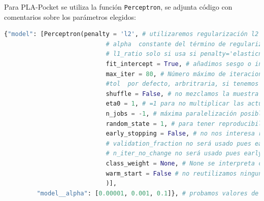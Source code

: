 \documentclass[11pt,a4paper]{article}
\theoremstyle{definition}
\begin{document}
	Para PLA-Pocket se utiliza la función \texttt{Perceptron}, se adjunta código con comentarios sobre los parámetros elegidos:
	\begin{lstlisting}[language=Python, caption= Par\'ametros usados en Perceptron, inputencoding=latin1]
  {"model": [Perceptron(penalty = 'l2', # utilizaremos regularización l2
                            # alpha  constante del término de regularización (probaremos distintos valores mediante 5-fold cross validation)
                            # l1_ratio solo si usa si penalty='elasticnet' que no es el caso
                            fit_intercept = True, # añadimos sesgo o intercept pues nuestra matriz aún no tiene columna de 1s 
                            max_iter = 80, # Número máximo de iteraciones arbitrario
                            #tol  por defecto, arbritraria, si tenemos loss > previous_loss - tol paramos
                            shuffle = False, # no mezclamos la muestra tras cada época
                            eta0 = 1, # =1 para no multiplicar las actualizaciones, no las alteramos
                            n_jobs = -1, # máxima paralelización posible en ejecución
                            random_state = 1, # para tener reproducibilidad de los resultados
                            early_stopping = False, # no nos interesa reservar más datos para validación (nuestro único criterio de parada serán las iteraciones)
                            # validation_fraction no será usado pues early_stopping = False
                            # n_iter_no_change no será usado pues early_stopping = False
                            class_weight = None, # None se interpreta como que todas las clases tienen peso 1, que es el caso
                            warm_start = False # no reutilizamos ninguna solución anterior durante la validación cruzada
                            )], 
         "model__alpha": [0.00001, 0.001, 0.1]}, # probamos valores de regularización arbitrarios dentro de los recomendados
	\end{lstlisting}
	
\end{document}
